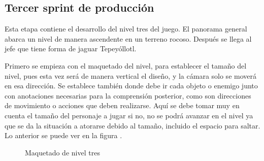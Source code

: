 
\subsection{Tercer sprint de producción}
Esta etapa contiene el desarrollo del nivel tres del juego. El panorama general abarca un nivel de manera ascendente en un terreno rocoso. Después se llega al jefe que tiene forma de jaguar Tepeyóllotl.

Primero se empieza con el maquetado del nivel, para establecer el tamaño del nivel, pues esta vez será de manera vertical el diseño, y la cámara solo se moverá en esa dirección. Se establece también donde debe ir cada objeto o enemigo junto con anotaciones necesarias para la comprensión posterior, como son direcciones de movimiento o acciones que deben realizarse. Aquí se debe tomar muy en cuenta el tamaño del personaje a jugar si no, no se podrá avanzar en el nivel ya que se da la situación a atorarse debido al tamaño, incluido el espacio para saltar. Lo anterior se puede ver en la figura \cite{fig:n01}.
\begin{figure}[htbp]
	\centering
	\caption{Maquetado de nivel tres} \label{fig:n01}
\end{figure}  

